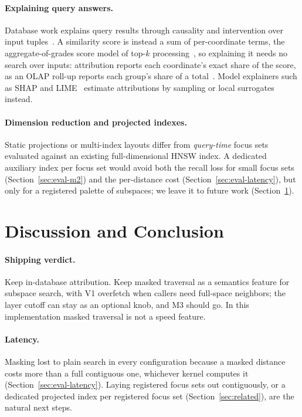 \documentclass[sigconf,review,balance=false]{acmart}
\begin{document}
\paragraph{Explaining query answers.} Database work explains query results
through causality and intervention over input
tuples~\cite{meliou2010causality,roy2014explanations}. A similarity score is
instead a sum of per-coordinate terms, the aggregate-of-grades score model of
top-$k$ processing~\cite{fagin2003optimal}, so explaining it needs no search
over inputs: attribution reports each coordinate's exact share of the score,
as an OLAP roll-up reports each group's share of a total~\cite{gray1998data}.
Model explainers such as SHAP and LIME~\cite{lundberg2017shap,ribeiro2016lime}
estimate attributions by sampling or local surrogates instead.

\paragraph{Dimension reduction and projected indexes.} Static projections or
multi-index layouts differ from \emph{query-time} focus sets evaluated against
an existing full-dimensional HNSW index. A dedicated auxiliary index per focus
set would avoid both the recall loss for small focus sets
(Section~\ref{sec:eval-m2}) and the per-distance cost
(Section~\ref{sec:eval-latency}), but only for a registered palette of
subspaces; we leave it to future work (Section~\ref{sec:discussion}).

\section{Discussion and Conclusion}
\label{sec:discussion}

\paragraph{Shipping verdict.} Keep in-database attribution. Keep masked
traversal as a semantics feature for subspace search, with V1 overfetch when
callers need full-space neighbors; the layer cutoff can stay as an optional
knob, and M3 should go. In this implementation masked traversal is not a
speed feature.

\paragraph{Latency.} Masking lost to plain search in every configuration
because a masked distance costs more than a full contiguous one, whichever
kernel computes it
(Section~\ref{sec:eval-latency}). Laying registered focus sets out
contiguously, or a dedicated projected index per registered focus set
(Section~\ref{sec:related}), are the natural next steps.
\end{document}
